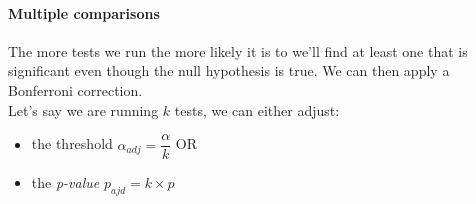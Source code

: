 \paragraph{Multiple comparisons}
The more tests we run the more likely it is to we'll find at least one that is significant
even though the null hypothesis is true. We can then apply a Bonferroni correction.\\
Let's say we are running $k$ tests, we can either adjust: 
\begin{itemize}
	\item the threshold $\alpha_{adj} = \dfrac{\alpha}{k}$ OR
	\item the \emph{p-value} $p_{ajd} = k\times p$
\end{itemize}
